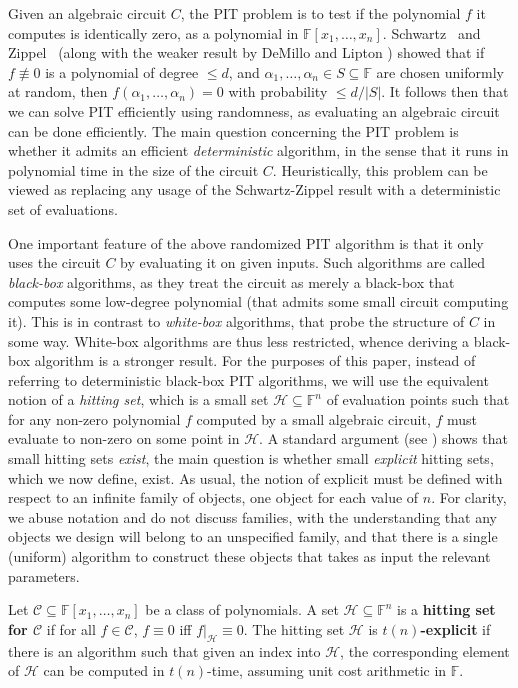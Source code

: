 \documentclass[letterpaper,11pt]{article}
\numberwithin{equation}{section}
\theoremstyle{plain}
\theoremstyle{remark}
\newcommand{\F}{\mathbb{F}}
\newcommand{\cC}{\mathcal{C}}
\newcommand{\cH}{\mathcal{H}}
\begin{document}
Given an algebraic circuit $C$, the PIT problem is to test if the polynomial $f$ it computes is identically zero, as a polynomial in $\F[x_1,\ldots,x_n]$. Schwartz~\cite{Schwartz80} and Zippel~\cite{Zippel79} (along with the weaker result by DeMillo and Lipton \cite{DemilloL78}) showed that if $f\not\equiv 0$ is a polynomial of degree $\le d$, and $\alpha_1,\ldots,\alpha_n\in S\subseteq\F$ are chosen uniformly at random, then $f(\alpha_1,\ldots,\alpha_n)=0$ with probability $\le d/|S|$.  It follows then that we can solve PIT efficiently using randomness, as evaluating an algebraic circuit can be done efficiently.  The main question concerning the PIT problem is whether it admits an efficient \textit{deterministic} algorithm, in the sense that it runs in polynomial time in the size of the circuit $C$. Heuristically, this problem can be viewed as replacing any usage of the Schwartz-Zippel result with a deterministic set of evaluations.

One important feature of the above randomized PIT algorithm is that it only uses the circuit $C$ by evaluating it on given inputs.  Such algorithms are called \textit{black-box} algorithms, as they treat the circuit as merely a black-box that computes some low-degree polynomial (that admits some small circuit computing it).  This is in contrast to \textit{white-box} algorithms, that probe the structure of $C$ in some way.  White-box algorithms are thus less restricted, whence deriving a black-box algorithm is a stronger result.  For the purposes of this paper, instead of referring to deterministic black-box PIT algorithms, we will use the equivalent notion of a \textit{hitting set}, which is a small set $\cH\subseteq\F^n$ of evaluation points such that for any non-zero polynomial $f$ computed by a small algebraic circuit, $f$ must evaluate to non-zero on some point in $\cH$.  A standard argument (see \cite{SY10}) shows that small hitting sets \textit{exist}, the main question is whether small \textit{explicit} hitting sets, which we now define, exist.  As usual, the notion of explicit must be defined with respect to an infinite family of objects, one object for each value of $n$.  For clarity, we abuse notation and do not discuss families, with the understanding that any objects we design will belong to an unspecified family, and that there is a single (uniform) algorithm to construct these objects that takes as input the relevant parameters.

\begin{definition}
	Let $\cC\subseteq\F[x_1,\ldots,x_n]$ be a class of polynomials.  A set $\cH\subseteq \F^n$ is a \textbf{hitting set for $\cC$} if for all $f\in\cC$, $f\equiv 0$ iff $f|_{\cH}\equiv 0$. The hitting set $\cH$ is \textbf{$t(n)$-explicit} if there is an algorithm such that given an index into $\cH$, the corresponding element of $\cH$ can be computed in $t(n)$-time, assuming unit cost arithmetic in $\F$.
\end{definition}
\end{document}
